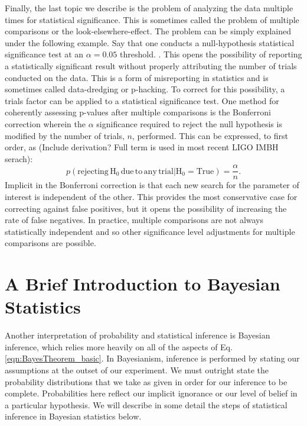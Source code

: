 Finally, the last topic we describe is the problem of analyzing the data multiple times for statistical significance. This is sometimes called the problem of multiple comparisons or the look-elsewhere-effect. The problem can be simply explained under the following example. Say that one conducts a null-hypothesis statistical significance test at an $\alpha = 0.05$ threshold. . This opens the possibility of reporting a statistically significant result without properly attributing the number of trials conducted on the data. This is a form of misreporting in statistics and is sometimes called data-dredging or p-hacking. To correct for this possibility, a trials factor can be applied to a statistical significance test. One method for coherently assessing p-values after multiple comparisons is the Bonferroni correction wherein the $\alpha$ significance required to reject the null hypothesis is modified by the number of trials, $n$, performed. This can be expressed, to first order, as (Include derivation? Full term is used in most recent LIGO IMBH serach):
\begin{equation}
    p\left(\mathrm{rejecting \, H_{0} \, due \, to \, any \, trial}| \mathrm{H_{0}} = \mathrm{True}\right) = \frac{\alpha}{n}.
\end{equation}
Implicit in the Bonferroni correction is that each new search for the parameter of interest is independent of the other. This provides the most conservative case for correcting against false positives, but it opens the possibility of increasing the rate of false negatives. In practice, multiple comparisons are not always statistically independent and so other significance level adjustments for multiple comparisons are possible.

\section{A Brief Introduction to Bayesian Statistics}
Another interpretation of probability and statistical inference is Bayesian inference, which relies more heavily on all of the aspects of Eq. \ref{eqn:BayesTheorem_basic}. In Bayesianism, inference is performed by stating our assumptions at the outset of our experiment. We must outright state the probability distributions that we take as given in order for our inference to be complete. Probabilities here reflect our implicit ignorance or our level of belief in a particular hypothesis. We will describe in some detail the steps of statistical inference in Bayesian statistics below.


